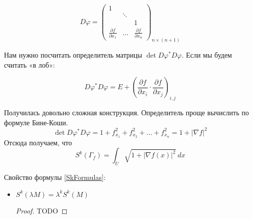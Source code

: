 \documentclass[a5paper]{article}
\theoremstyle{plain}
\theoremstyle{definition}
\numberwithin{through}{section}
\numberwithin{equation}{section}
\begin{document}
\[
	D\varphi = 
\begin{pmatrix}
	1 & & \\
	& \ddots & \\
	& & 1 \\\hline
	\frac{\partial f}{\partial x_1} &
	\ldots & 
	\frac{\partial f}{\partial x_n}
	
\end{pmatrix}_{n \times (n+1)}
\]

Нам нужно посчитать определитель матрицы $\det D\varphi^*
D\varphi$. Если мы будем считать «в лоб»:

\begin{equation*}
	D\varphi^* D\varphi = E +
	\left( \frac{\partial f}{\partial x_i} \cdot
	\frac{\partial f}{\partial x_j} \right)_{i, j}
\end{equation*}

Получилась довольно сложная конструкция.
Определитель проще вычислить по формуле Бине-Коши. 
\[\det D\varphi^*D\varphi = 1 + f_{x_1}^2 + f_{x_2}^2 + \ldots
+ f_{x_n}^2 = 1 + |\nabla f|^2\]
Отсюда получаем, что 
\begin{equation*} \label{SkFormulas}
	S^k(\Gamma_f) = \int_U \sqrt{1 + |\nabla f(x) |^2}\ dx 
\end{equation*}

Свойство формулы \ref{SkFormulas}:
\begin{itemize}
	 \item 
	 $S^k(\lambda M) = \lambda^k S^k(M)$
	 \begin{proof}
	 TODO %
	 \end{proof}
	 
\end{itemize}
\end{document}
